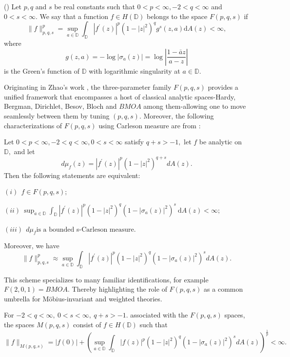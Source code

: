 \documentclass[12pt, reqno]{amsart}
\begin{document}
\begin{definition} {\rm(\cite{ZR})
 Let  $p, q$  and  $s$  be real constants such that  $0<p<\infty,-2<q<\infty$  and  $0<s<\infty.$ We say that a function  $f \in H(\mathbb{D})$  belongs to the space  $F(p, q, s)$  if
$$\|f\|_{p, q, s}^{p}=\sup _{a \in \mathbb{D}} \int_{\mathbb{D}}\left|f^{\prime}(z)\right|^{p}\left(1-|z|^{2}\right)^{q} g^{s}(z, a) \mathrm{d} A(z)<\infty,$$
where  $$g(z, a)=-\log \left|\sigma_{a}(z)\right|=\log \left|\frac{1-\bar{a} z}{a-z}\right|$$  is the Green's function of $\mathbb{D}$  with logarithmic singularity at $a \in \mathbb{D}.$}    
\end{definition}

Originating in Zhao’s work \cite{ZR1}, the three-parameter family $F(p,q,s)$ provides a unified framework that encompasses a host of classical analytic spaces-Hardy, Bergman, Dirichlet, Besov, Bloch and $BMOA$ among them-allowing one to move seamlessly between them by tuning $(p,q,s).$ Moreover, the following characterizations of $F(p,q,s)$ using Carleson measure are from \cite[Theorem 3.3]{ZR1}:

\begin{lemma}
Let  $0<p<\infty,-2<q<\infty, 0< s<\infty$  satisfy  $q+s>-1,$ let  $f$  be analytic on  $\mathbb{D},$ and let  $$d\mu_{f}(z)=\left|f^{\prime}(z)\right|^{p}\left(1-|z|^{2}\right)^{q+s} dA(z).$$ Then the following statements are equivalent:

$(i) ~~f \in F(p, q, s) ;$

$(ii) ~\sup _{a \in \mathbb{D}} \int_{\mathbb{D}}\left|f^{\prime}(z)\right|^{p}\left(1-|z|^{2}\right)^{q}\left(1-\left|\sigma_{a}(z)\right|^{2}\right)^{s} \mathrm{~d} A(z)<\infty ;$

$(iii)~~d\mu_{f} \text{is a bounded } $s-$\text{Carleson measure.}$

\noindent Moreover, we have
$$\|f\|_{p, q, s}^{p} \approx \sup _{a \in \mathbb{D}} \int_{\mathbb{D}}\left|f^{\prime}(z)\right|^{p}\left(1-|z|^{2}\right)^{q}\left(1-\left|\sigma_{a}(z)\right|^{2}\right)^{s} dA(z).$$ 
\end{lemma}

This scheme specializes to many familiar identifications, for example $F(2,0,1)=BMOA.$ Thereby highlighting the role of $F(p,q,s)$ as a common umbrella for Möbius-invariant and weighted theories.

\begin{definition}
{\rm For  $-2<q<\infty,~0<s<\infty,~q+s>-1.$ associated with the $F(p,q,s)$ spaces, the spaces  $M(p,q,s)$ consist of $f\in H(\mathbb{D})$ such that
$$\|f\|_{M(p,q,s)}=|f(0)|+\left(\sup _{a \in \mathbb{D}} \int_{\mathbb{D}}|f(z)|^{p}\left(1-|z|^{2}\right)^{q}\left(1-\left|\sigma_{a}(z)\right|^{2}\right)^{s} d A(z)\right)^{\frac{1}{p}}<\infty.$$}
\end{definition}
\end{document}
